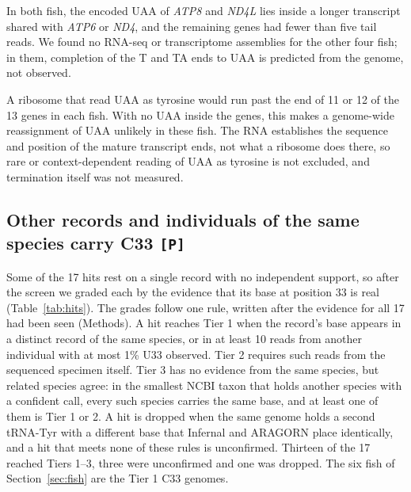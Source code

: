 \documentclass[11pt, a4paper]{article}
\begin{document}
In both fish, the encoded UAA of \textit{ATP8} and \textit{ND4L} lies inside a longer transcript shared with \textit{ATP6} or \textit{ND4}, and the remaining genes had fewer than five tail reads. We found no RNA-seq or transcriptome assemblies for the other four fish; in them, completion of the T and TA ends to UAA is predicted from the genome, not observed.

A ribosome that read UAA as tyrosine would run past the end of 11 or 12 of the 13 genes in each fish. With no UAA inside the genes, this makes a genome-wide reassignment of UAA unlikely in these fish. The RNA establishes the sequence and position of the mature transcript ends, not what a ribosome does there, so rare or context-dependent reading of UAA as tyrosine is not excluded, and termination itself was not measured.

\subsection{Other records and individuals of the same species carry C33 \texttt{[P]}}\label{sec:support}
Some of the 17 hits rest on a single record with no independent support, so after the screen we graded each by the evidence that its base at position 33 is real (Table~\ref{tab:hits}). The grades follow one rule, written after the evidence for all 17 had been seen (Methods). A hit reaches Tier 1 when the record's base appears in a distinct record of the same species, or in at least 10 reads from another individual with at most 1\% U33 observed. Tier 2 requires such reads from the sequenced specimen itself. Tier 3 has no evidence from the same species, but related species agree: in the smallest NCBI taxon that holds another species with a confident call, every such species carries the same base, and at least one of them is Tier 1 or 2. A hit is dropped when the same genome holds a second tRNA-Tyr with a different base that Infernal and ARAGORN place identically, and a hit that meets none of these rules is unconfirmed. Thirteen of the 17 reached Tiers 1--3, three were unconfirmed and one was dropped. The six fish of Section~\ref{sec:fish} are the Tier 1 C33 genomes.
\end{document}
